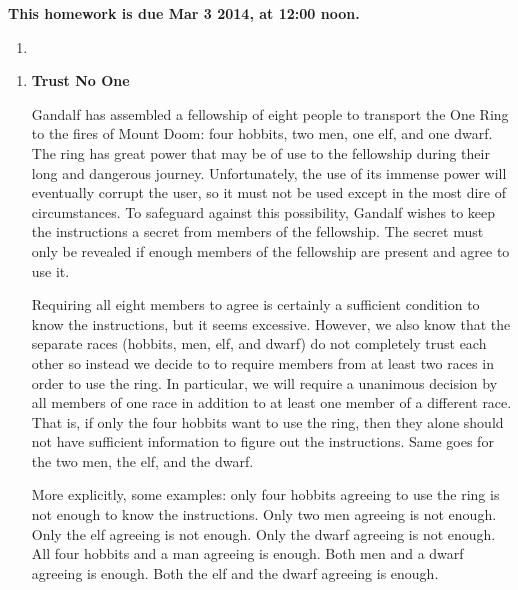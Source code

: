 \documentclass[]{article}
\newif\ifsolutions
\renewcommand{\answer}[1]{{\color{mydarkblue}\textbf{}#1}}
\begin{document}
\maketitle
{}
\vspace{0.5em}
{\Large{\textbf{This homework is due Mar 3 2014, at 12:00 noon.}}}

\begin{qunlist}
  
\begin{enumerate}
\qpart
\item
\ifsolutions{ \answer 
{
}}\fi


\ifsolutions{ \answer {
\textbf{Motivation}
}}\fi
\end{enumerate}

  
\begin{enumerate}
\qpart
\item {\bf Trust No One}

Gandalf has assembled a fellowship of eight people to transport the One Ring to the fires of Mount Doom: four hobbits, two men, one elf, and one dwarf. The ring has great power that may be of use to the fellowship during their long and dangerous journey. Unfortunately, the use of its immense power will eventually corrupt the user, so it must not be used except in the most dire of circumstances. To safeguard against this possibility, Gandalf wishes to keep the instructions a secret from members of the fellowship. The secret must only be revealed if enough members of the fellowship are present and agree to use it.

Requiring all eight members to agree is certainly a sufficient condition to know the instructions, but it seems excessive. However, we also know that the separate races (hobbits, men, elf, and dwarf) do not completely trust each other so instead we decide to to require members from at least two races in order to use the ring. In particular, we will require a unanimous decision by all members of one race in addition to at least one member of a different race. That is, if only the four hobbits want to use the ring, then they alone should not have sufficient information to figure out the instructions. Same goes for the two men, the elf, and the dwarf.

More explicitly, some examples: only four hobbits agreeing to use the ring is not enough to know the instructions. Only two men agreeing is not enough. Only the elf agreeing is not enough. Only the dwarf agreeing is not enough. All four hobbits and a man agreeing is enough. Both men and a dwarf agreeing is enough. Both the elf and the dwarf agreeing is enough.


\end{enumerate}
\end{qunlist}
\end{document}
